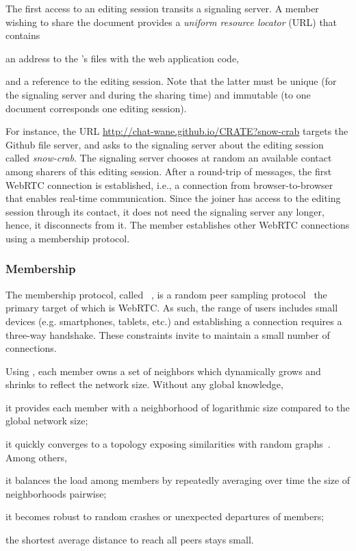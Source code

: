 The first access to an editing session transits a signaling server. A member
wishing to share the document provides a \emph{uniform resource locator} (URL)
that contains
\begin{inparaenum}[(i)]
\item an address to the \CRATE's files with the web application
  code,
\item and a reference to the editing session. Note that the latter must be
  unique (for the signaling server and during the sharing time) and
  immutable (to one document corresponds one editing session).
\end{inparaenum}
For instance, the URL \url{http://chat-wane.github.io/CRATE?snow-crab} targets
the Github file server, and asks to the signaling server about the editing
session called \emph{snow-crab}.  The signaling server chooses at random an
available contact among sharers of this editing session. After a round-trip of
messages, the first WebRTC connection is established, i.e., a connection from
browser-to-browser that enables real-time communication. Since the joiner has
access to the editing session through its contact, it does not need the
signaling server any longer, hence, it disconnects from it. The member
establishes other WebRTC connections using a membership protocol.

\subsubsection{Membership}

The membership protocol, called \SPRAY~\cite{nedelec2015spray}, is a random peer
sampling protocol~\cite{jelasity2007gossip} the primary target of which is
WebRTC.  As such, the range of users includes small devices (e.g. smartphones,
tablets, etc.) and establishing a connection requires a three-way
handshake. These constraints invite to maintain a small number of connections.

Using \SPRAY, each member owns a set of neighbors which dynamically grows and
shrinks to reflect the network size. Without any global knowledge,
\begin{inparaenum}[(i)]
\item it provides each member with a neighborhood of logarithmic size compared
  to the global network size;
\item it quickly converges to a topology exposing similarities with random
  graphs~\cite{erdos1959random}. Among others,
  \begin{inparaenum}[(a)]
  \item it balances the load among members by repeatedly averaging over time the
    size of neighborhoods pairwise;
  \item it becomes robust to random crashes or unexpected departures of
    members;
  \item the shortest average distance to reach all peers stays small.
  \end{inparaenum}
\end{inparaenum}


